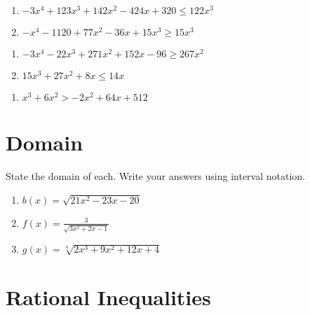 \begin{multicols}{2}
\begin{enumerate}	\setcounter{enumi}{\value{Review}}
\item $-3x^4 + 123x^3 + 142x^2 - 424x + 320 \leq 122x^3$
\item $-x^4 - 1120 + 77x^2 - 36x + 15x^3 \geq 15x^3$
\end{enumerate} \setcounter{Review}{\value{enumi}}
\end{multicols}
\begin{multicols}{2}
\begin{enumerate}	\setcounter{enumi}{\value{Review}}
\item $-3x^4 - 22x^3 + 271x^2 + 152x - 96 \geq 267x^2$
\item $15x^3 + 27x^2 + 8x \leq 14x$
\end{enumerate}	\setcounter{enumi}{\value{Review}}
\end{multicols}
\begin{multicols}{2}
\begin{enumerate}	\setcounter{enumi}{\value{Review}}
\item $x^3 + 6x^2 > -2x^2 + 64x + 512$

\end{enumerate}	\setcounter{enumi}{\value{Review}}
\end{multicols}

\section{Domain}

State the domain of each. Write your answers using interval notation.
\begin{enumerate}
\item $b(x) = \sqrt{21x^2 - 23x - 20}$
\item $f(x) = \frac{3}{\sqrt{3x^2 + 2x - 1}}$
\item $g(x) = \sqrt[4]{2x^3+9x^2+12x+4}$
\end{enumerate}

\section{Rational Inequalities}


